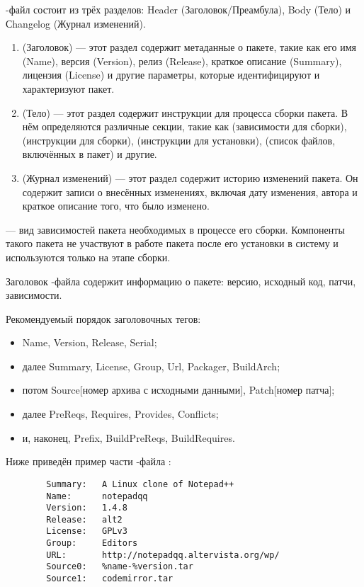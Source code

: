 -файл состоит из трёх разделов: Header (Заголовок/Преамбула), Body (Тело) и Сhangelog (Журнал изменений).
\begin{enumerate}
	\item {} (Заголовок) --- этот раздел содержит метаданные о пакете, такие как его имя (Name),
		версия (Version), релиз (Release), краткое описание (Summary), лицензия (License) и другие
		параметры, которые идентифицируют и характеризуют пакет.
	\item {} (Тело) --- этот раздел содержит инструкции для процесса сборки пакета. В нём
		определяются различные секции, такие как  (зависимости для сборки),
		 (инструкции для сборки),  (инструкции для установки),
		 (список файлов, включённых в пакет) и другие.
	\item {} (Журнал изменений) --- этот раздел содержит историю изменений пакета.
		Он содержит записи о внесённых изменениях, включая дату изменения, автора и краткое
		описание того, что было изменено.
\end{enumerate}

 --- вид зависимостей пакета
необходимых в процессе его сборки. Компоненты такого пакета не участвуют в работе пакета после его установки в
систему и используются только на этапе сборки.


Заголовок -файла содержит информацию о пакете: версию, исходный код, патчи, зависимости.

Рекомендуемый порядок заголовочных тегов:
\begin{itemize}
	\item Name, Version, Release, Serial;
	\item далее Summary, License, Group, Url, Packager, BuildArch;
	\item потом Source[номер архива с исходными данными], Patch[номер патча];
	\item далее PreReqs, Requires, Provides, Conflicts;
	\item и, наконец, Prefix, BuildPreReqs, BuildRequires.
\end{itemize}

Ниже приведён пример части -файла :
\begin{verbatim}
        Summary:   A Linux clone of Notepad++
        Name:      notepadqq
        Version:   1.4.8
        Release:   alt2
        License:   GPLv3
        Group:     Editors
        URL:       http://notepadqq.altervista.org/wp/
        Source0:   %name-%version.tar
        Source1:   codemirror.tar
\end{verbatim}

